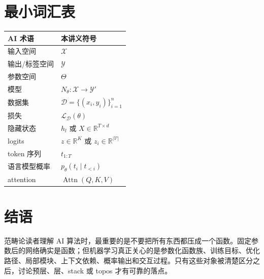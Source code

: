 \documentclass[UTF8,11pt,fontset=none]{ctexart}
\newcommand{\R}{\mathbb{R}}
\newcommand{\Vocab}{\mathcal V}
\newcommand{\D}{\mathcal D}
\newcommand{\X}{\mathcal X}
\newcommand{\Y}{\mathcal Y}
\newcommand{\ThetaSet}{\Theta}
\newcommand{\Loss}{\mathcal L}
\newcommand{\Attn}{\operatorname{Attn}}
\begin{document}
\section{最小词汇表}

\begin{center}
\begin{tabular}{ll}
\toprule
AI 术语 & 本讲义符号 \\
\midrule
输入空间 & \(\X\) \\
输出/标签空间 & \(\Y\) \\
参数空间 & \(\ThetaSet\) \\
模型 & \(N_\theta:\X\to\Y'\) \\
数据集 & \(\D=\{(x_i,y_i)\}_{i=1}^n\) \\
损失 & \(\Loss_{\D}(\theta)\) \\
隐藏状态 & \(h_l\) 或 \(X\in\R^{T\times d}\) \\
logits & \(z\in\R^K\) 或 \(z_i\in\R^{|\Vocab|}\) \\
token 序列 & \(t_{1:T}\) \\
语言模型概率 & \(p_\theta(t_i\mid t_{<i})\) \\
attention & \(\Attn(Q,K,V)\) \\
\bottomrule
\end{tabular}
\end{center}

\section{结语}

范畴论读者理解 AI 算法时，最重要的是不要把所有东西都压成一个函数。固定参数后的网络确实是函数；但机器学习真正关心的是参数化函数族、训练目标、优化路径、局部模块、上下文依赖、概率输出和交互过程。只有这些对象被清楚区分之后，讨论预层、层、stack 或 topos 才有可靠的落点。
\end{document}
